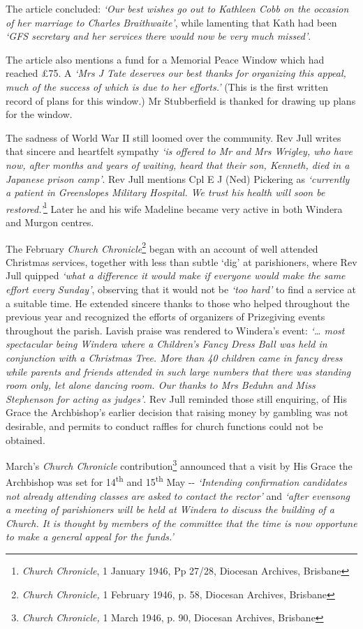 The article concluded: \emph{`Our best wishes go out to Kathleen Cobb on the occasion of her marriage to Charles} \emph{Braithwaite'}, while lamenting that Kath had been \emph{`GFS secretary and her services there would now be very much missed'}.

The article also mentions a fund for a Memorial Peace Window which had reached £75. A \emph{`Mrs J Tate deserves our best thanks for organizing this appeal, much of the success of which is due to her efforts.'} (This is the first written record of plans for this window.) Mr Stubberfield is thanked for drawing up plans for the window.

The sadness of World War II still loomed over the community. Rev Jull writes that sincere and heartfelt sympathy \emph{`is offered to Mr and Mrs Wrigley, who have now, after months and years of waiting, heard that their son, Kenneth, died in a Japanese prison camp'}. Rev Jull mentions Cpl E J (Ned) Pickering as \emph{`currently a patient in Greenslopes Military Hospital. We trust his health will soon be restored.'}\footnote{\emph{Church Chronicle}, 1 January 1946, Pp 27/28, Diocesan Archives, Brisbane} Later he and his wife Madeline became very active in both Windera and Murgon centres.

The February \emph{Church Chronicle}\footnote{\emph{Church Chronicle,} 1 February 1946, p. 58, Diocesan Archives, Brisbane} began with an account of well attended Christmas services, together with less than subtle `dig' at parishioners, where Rev Jull quipped \emph{`what a difference it would make if everyone would make the same effort every Sunday'}, observing that it would not be \emph{`too hard'} to find a service at a suitable time. He extended sincere thanks to those who helped throughout the previous year and recognized the efforts of organizers of Prizegiving events throughout the parish. Lavish praise was rendered to Windera's event: \emph{`\ldots{} most spectacular being Windera where a Children's Fancy Dress Ball was held in conjunction with a Christmas Tree. More than 40 children came in fancy dress while parents and friends attended in such large numbers that there was standing room only, let alone dancing room. Our thanks to Mrs Beduhn and Miss Stephenson for acting as judges'}. Rev Jull reminded those still enquiring, of His Grace the Archbishop's earlier decision that raising money by gambling was not desirable, and permits to conduct raffles for church functions could not be obtained.

March's \emph{Church Chronicle} contribution\footnote{\emph{Church Chronicle,} 1 March 1946, p. 90, Diocesan Archives, Brisbane} announced that a visit by His Grace the Archbishop was set for 14\textsuperscript{th} and 15\textsuperscript{th} May -\/- \emph{`Intending confirmation candidates not already attending classes are asked to contact the rector'} and \emph{`after evensong a meeting of parishioners will be held at Windera to discuss the building of a Church. It is thought by members of the committee that the time is now opportune to make a general appeal for the funds.'}

